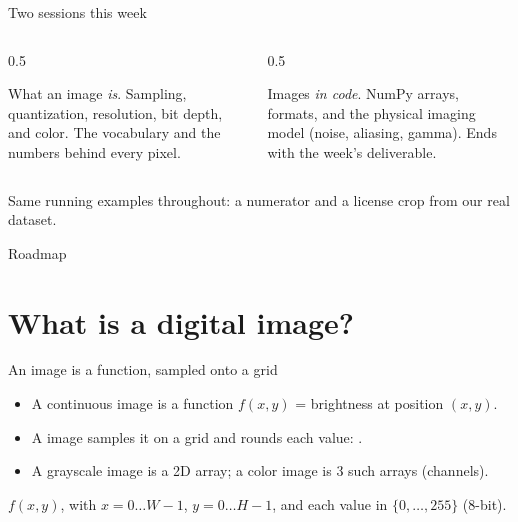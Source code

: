 \documentclass[10pt,aspectratio=169]{beamer}
\begin{document}
\begin{frame}{Two sessions this week}
  \begin{columns}[T]
    \begin{column}{0.5\textwidth}
      \begin{infobox}
        What an image \emph{is}. Sampling, quantization, resolution, bit depth, and color.
        The vocabulary and the numbers behind every pixel.
      \end{infobox}
    \end{column}
    \begin{column}{0.5\textwidth}
      \begin{infobox}
        Images \emph{in code}. NumPy arrays, formats, and the physical imaging model
        (noise, aliasing, gamma). Ends with the week's deliverable.
      \end{infobox}
    \end{column}
  \end{columns}
  \vspace{4pt}
  Same running examples throughout: a  numerator and a license
   crop from our real dataset.
\end{frame}

\begin{frame}{Roadmap}\tableofcontents\end{frame}

\section{What is a digital image?}

\begin{frame}{An image is a function, sampled onto a grid}
  \begin{itemize}
    \item A continuous image is a function $f(x,y)$ = brightness at position $(x,y)$.
    \item A  image samples it on a grid and rounds each value: .
    \item A grayscale image is a 2D array; a color image is 3 such arrays (channels).
  \end{itemize}
  \begin{mathbox}
    $f(x,y)$, with $x=0\dots W{-}1$, $y=0\dots H{-}1$, and each value in $\{0,\dots,255\}$ (8-bit).
  \end{mathbox}
\end{frame}
\end{document}
